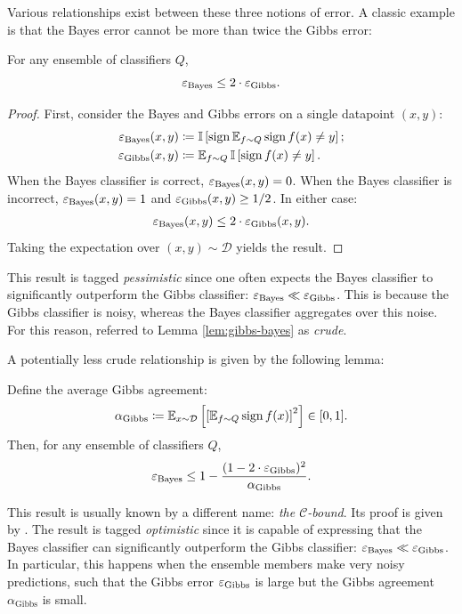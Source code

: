 \begin{refsection}
Various relationships exist between these three notions of error. A classic example is that the Bayes error cannot be more than twice the Gibbs error:
\begin{lemma}\label{lem:gibbs-bayes} For any ensemble of classifiers $Q$,
\begin{equation*}
    \varepsilon_{\mathrm{Bayes}} \leq 2 \cdot \varepsilon_{\mathrm{Gibbs}}.
\end{equation*}
\end{lemma}
\begin{proof}
    First, consider the Bayes and Gibbs errors on a single datapoint $(x,y)$:
    \begin{align*}
    \varepsilon_{\mathrm{Bayes}}(x,y) &\coloneqq \mathbb{I}\left[\operatorname{sign} \operatorname{\mathbb{E}}_{f\sim Q}\operatorname{sign} f(x)\neq y\right]; \\
    \varepsilon_{\mathrm{Gibbs}}(x,y)&\coloneqq\operatorname{\mathbb{E}}_{f\sim Q} \mathbb{I}\left[\operatorname{sign} f(x)\neq y\right].
    \end{align*}
    When the Bayes classifier is correct, $\varepsilon_{\mathrm{Bayes}}(x,y)=0$. When the Bayes classifier is incorrect, $\varepsilon_{\mathrm{Bayes}}(x,y)=1$ and $\varepsilon_{\mathrm{Gibbs}}(x,y) \geq 1/2$. In either case:
    \begin{align*}
        \varepsilon_{\mathrm{Bayes}}(x,y)\leq 2\cdot \varepsilon_{\mathrm{Gibbs}}(x,y).
    \end{align*}
    Taking the expectation over $(x,y)\sim\mathcal{D}$ yields the result.
\end{proof}

This result is tagged \textit{pessimistic} since one often expects the Bayes classifier to significantly outperform the Gibbs classifier: $\varepsilon_{\mathrm{Bayes}} \ll \varepsilon_{\mathrm{Gibbs}}$. This is because the Gibbs classifier is noisy, whereas the Bayes classifier aggregates over this noise. For this reason, \citet{seeger} referred to Lemma \ref{lem:gibbs-bayes} as \textit{crude}.

A potentially less crude relationship is given by the following lemma:
\begin{lemma}\label{lem:gibbs-bayes-opt} Define the average Gibbs agreement:
\begin{equation*}
\alpha_{\mathrm{Gibbs}}\coloneqq\operatorname{\mathbb{E}}_{x\sim\mathcal{D}}\left[\left[\operatorname{\mathbb{E}}_{f\sim Q}\operatorname{sign} f(x)\right]^2\right]\in[0,1].
\end{equation*}
Then, for any ensemble of classifiers $Q$,
\begin{equation*}
    \varepsilon_{\mathrm{Bayes}} \leq 1 - \frac{(1-2 \cdot \varepsilon_{\mathrm{Gibbs}})^2}{\alpha_{\mathrm{Gibbs}}}.
\end{equation*}
\end{lemma}
This result is usually known by a different name: \textit{the $\mathcal{C}$-bound}. Its proof is given by \citet{lacasse}. The result is tagged \textit{optimistic} since it is capable of expressing that the Bayes classifier can significantly outperform the Gibbs classifier: $\varepsilon_{\mathrm{Bayes}} \ll \varepsilon_{\mathrm{Gibbs}}$. In particular, this happens when the ensemble members make very noisy predictions, such that the Gibbs error $\varepsilon_{\mathrm{Gibbs}}$ is large but the Gibbs agreement $\alpha_{\mathrm{Gibbs}}$ is small.


\end{refsection}
